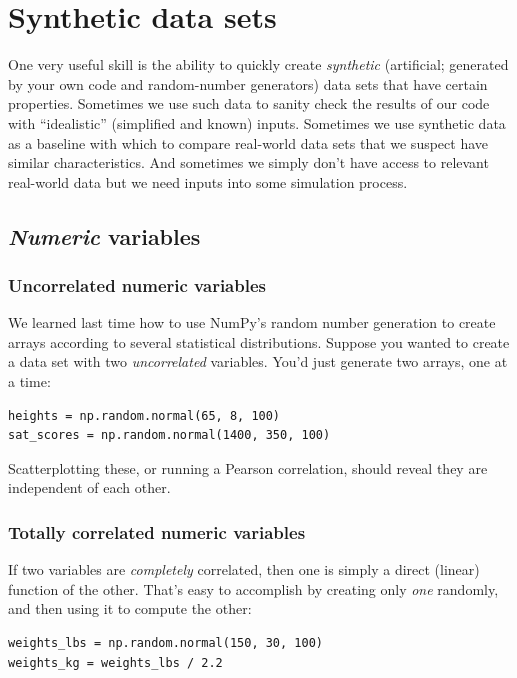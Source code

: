 
\chapter{Synthetic data sets}


One very useful skill is the ability to quickly create \textit{synthetic}
(artificial; generated by your own code and random-number generators) data
sets that have certain properties. Sometimes we use such data to sanity check
the results of our code with ``idealistic'' (simplified and known) inputs.
Sometimes we use synthetic data as a baseline with which to compare real-world
data sets that we suspect have similar characteristics. And sometimes we
simply don't have access to relevant real-world data but we need inputs into
some simulation process.

\section{\textit{Numeric} variables}

\subsection{Uncorrelated numeric variables}

We learned last time how to use NumPy's random number generation to create
arrays according to several statistical distributions. Suppose you wanted to
create a data set with two \textit{uncorrelated} variables. You'd just
generate two arrays, one at a time:

\begin{Verbatim}[fontsize=\small,samepage=true,frame=single]
heights = np.random.normal(65, 8, 100)
sat_scores = np.random.normal(1400, 350, 100)
\end{Verbatim}

Scatterplotting these, or running a Pearson correlation, should reveal they
are independent of each other.

\subsection{Totally correlated numeric variables}

If two variables are \textit{completely} correlated, then one is simply a
direct (linear) function of the other. That's easy to accomplish by creating
only \textit{one} randomly, and then using it to compute the other:

\begin{Verbatim}[fontsize=\small,samepage=true,frame=single]
weights_lbs = np.random.normal(150, 30, 100)
weights_kg = weights_lbs / 2.2
\end{Verbatim}

